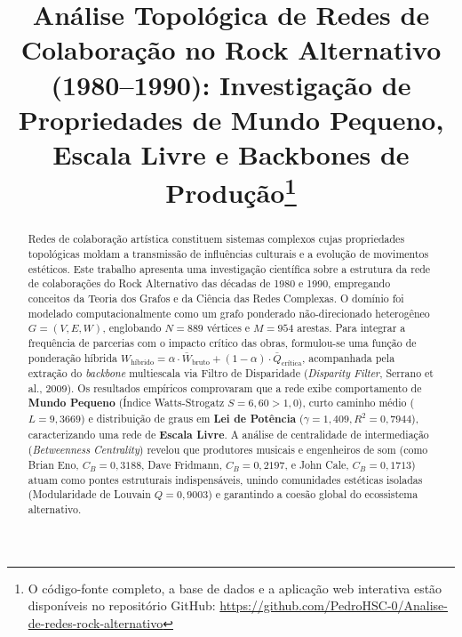 \documentclass[conference]{IEEEtran}
\begin{document}
\title{Análise Topológica de Redes de Colaboração no Rock Alternativo (1980--1990): Investigação de Propriedades de Mundo Pequeno, Escala Livre e Backbones de Produção\thanks{O código-fonte completo, a base de dados e a aplicação web interativa estão disponíveis no repositório GitHub: \url{https://github.com/PedroHSC-0/Analise-de-redes-rock-alternativo}}}

\author{
\and
{}
}

\maketitle

\begin{abstract}
Redes de colaboração artística constituem sistemas complexos cujas propriedades topológicas moldam a transmissão de influências culturais e a evolução de movimentos estéticos. Este trabalho apresenta uma investigação científica sobre a estrutura da rede de colaborações do Rock Alternativo das décadas de 1980 e 1990, empregando conceitos da Teoria dos Grafos e da Ciência das Redes Complexas. O domínio foi modelado computacionalmente como um grafo ponderado não-direcionado heterogêneo $G=(V, E, W)$, englobando $N=889$ vértices e $M=954$ arestas. Para integrar a frequência de parcerias com o impacto crítico das obras, formulou-se uma função de ponderação híbrida $W_{\text{híbrido}} = \alpha \cdot \bar{W}_{\text{bruto}} + (1-\alpha) \cdot \bar{Q}_{\text{crítica}}$, acompanhada pela extração do \textit{backbone} multiescala via Filtro de Disparidade (\textit{Disparity Filter}, Serrano et al., 2009). Os resultados empíricos comprovaram que a rede exibe comportamento de \textbf{Mundo Pequeno} (Índice Watts-Strogatz $S = 6,60 > 1,0$), curto caminho médio ($L = 9,3669$) e distribuição de graus em \textbf{Lei de Potência} ($\gamma = 1,409, R^2 = 0,7944$), caracterizando uma rede de \textbf{Escala Livre}. A análise de centralidade de intermediação (\textit{Betweenness Centrality}) revelou que produtores musicais e engenheiros de som (como Brian Eno, $C_B = 0,3188$, Dave Fridmann, $C_B = 0,2197$, e John Cale, $C_B = 0,1713$) atuam como pontes estruturais indispensáveis, unindo comunidades estéticas isoladas (Modularidade de Louvain $Q = 0,9003$) e garantindo a coesão global do ecossistema alternativo.
\end{abstract}
\end{document}
